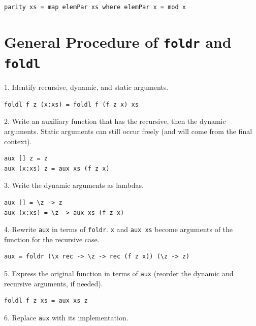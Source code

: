 \documentclass{article}
\begin{document}
\begin{lstlisting}[style=haskellstyle, caption=Haskell Code, label=code:haskell]
    parity xs = map elemPar xs where elemPar x = mod x 
\end{lstlisting}

\section*{General Procedure of \texttt{foldr} and \texttt{foldl}}

1. Identify recursive, dynamic, and static arguments.

\begin{lstlisting}[style=haskellstyle, caption=Haskell Code, label=code:haskell]
    foldl f z (x:xs) = foldl f (f z x) xs
\end{lstlisting}

2. Write an auxiliary function that has the recursive, then the dynamic arguments. Static arguments can still occur freely (and will come from the final context).

\begin{lstlisting}[style=haskellstyle, caption=Haskell Code, label=code:haskell]
    aux [] z = z
aux (x:xs) z = aux xs (f z x)
\end{lstlisting}

3. Write the dynamic arguments as lambdas.

\begin{lstlisting}[style=haskellstyle, caption=Haskell Code, label=code:haskell]
    aux [] = \z -> z
aux (x:xs) = \z -> aux xs (f z x)
\end{lstlisting}

4. Rewrite \texttt{aux} in terms of \texttt{foldr}. \texttt{x} and \texttt{aux xs} become arguments of the function for the recursive case.

\begin{lstlisting}[style=haskellstyle, caption=Haskell Code, label=code:haskell]
    aux = foldr (\x rec -> \z -> rec (f z x)) (\z -> z)
\end{lstlisting}

5. Express the original function in terms of \texttt{aux} (reorder the dynamic and recursive arguments, if needed).

\begin{lstlisting}[style=haskellstyle, caption=Haskell Code, label=code:haskell]
    foldl f z xs = aux xs z
\end{lstlisting}

6. Replace \texttt{aux} with its implementation.
\end{document}
